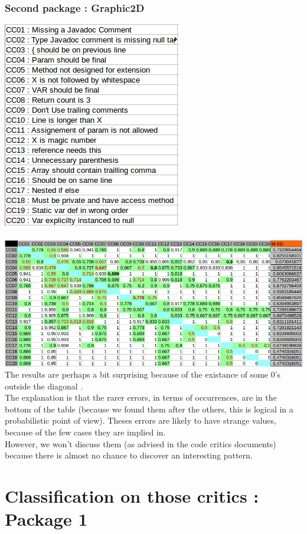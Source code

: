 \documentclass{article}
\begin{document}
\subsubsection{Second package : Graphic2D}
\includegraphics[scale=0.5]{names01.png} \\ \\
\includegraphics[scale=0.5]{01.png} \\

The results are perhaps a bit surprising because of the existance of some 0's outside the diagonal .\\

The explanation is that the rarer errors, in terms of occurrences, are in the bottom of the table (because we found them after the others, this is logical in a probabilistic point of view). Theses errors are likely to have strange values, because of the few cases they are implied in. \\
However, we won't discuss them (as advised in the code critics documents) because there is almost no chance to discover an interesting pattern.


\section{Classification on those critics : Package 1}
\end{document}
